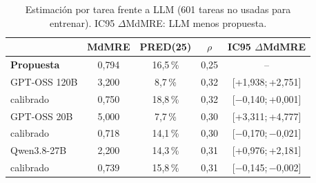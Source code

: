 \begin{table}[t]
\centering
\caption{Estimación por tarea frente a LLM (601 tareas no usadas para entrenar). IC95 $\Delta$MdMRE: LLM menos propuesta.}
\label{tab:llm_estimacion}
\footnotesize
\setlength{\tabcolsep}{3pt}
\begin{tabular}{lcccc}
\toprule
 & MdMRE & PRED(25) & $\rho$ & IC95 $\Delta$MdMRE \\
\midrule
\textbf{Propuesta} & 0{,}794 & 16{,}5\,\% & 0{,}25 & -- \\
\midrule
GPT-OSS 120B & 3{,}200 & 8{,}7\,\% & 0{,}32 & [+1{,}938;\,+2{,}751] \\
\quad calibrado & 0{,}750 & 18{,}8\,\% & 0{,}32 & [$-$0{,}140;\,+0{,}001] \\
\midrule
GPT-OSS 20B & 5{,}000 & 7{,}7\,\% & 0{,}30 & [+3{,}311;\,+4{,}777] \\
\quad calibrado & 0{,}718 & 14{,}1\,\% & 0{,}30 & [$-$0{,}170;\,$-$0{,}021] \\
\midrule
Qwen3.8-27B & 2{,}200 & 14{,}3\,\% & 0{,}31 & [+0{,}976;\,+2{,}181] \\
\quad calibrado & 0{,}739 & 15{,}8\,\% & 0{,}31 & [$-$0{,}145;\,$-$0{,}002] \\
\bottomrule
\end{tabular}
\end{table}
